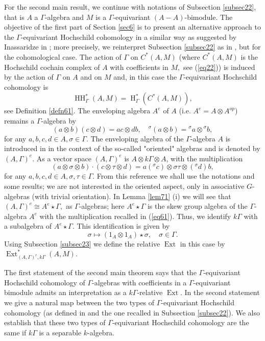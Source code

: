 \documentclass[pdflatex,sn-mathphys-num]{sn-jnl}
\numberwithin{equation}{section}
\theoremstyle{thmstyleone}
\theoremstyle{thmstyletwo}
\theoremstyle{thmstylethree}
\newcommand{\Ext}{\operatorname{Ext}}
\newcommand{\Hrm}{\operatorname{H}}
\newcommand{\HH}{\operatorname{HH}}
\begin{document}
For the second main result, we continue  with notations of Subsection \ref{subsec22}, that is $A$ a $\Gamma$-algebra and $M$ is a $\Gamma$-equivariant $(A-A)$-bimodule. The objective of the first part of Section \ref{sec6} is to present an alternative approach to the $\Gamma$-equivariant Hochschild cohomology in a similar way as suggested by Inassaridze in \cite[Section 5]{In}; more precisely, we reinterpret Subsection \ref{subsec22} as in \cite[Definition 5.1]{In}, but for the cohomological case. The action of $\Gamma$ on $C^*(A,M)$ (where $C^*(A,M)$ is the Hochschild cochain complex of $A$ with coefficients in $M,$ see (\ref{eq22})) is induced by the action of $\Gamma$ on $A$ and on $M$ and, in this case the $\Gamma$-equivariant Hochschild cohomology is
$$\HH_{\Gamma}^*(A,M)=\Hrm_{\Gamma}^*(C^*(A,M)),$$
see Definition \ref{defn61}. The enveloping algebra $A^e$ of $A$ (i.e. $A^e=A\otimes A^{op}$) remains a $\Gamma$-algebra by
$$(a\otimes b)(c\otimes d)=ac \otimes db,\quad {}^{\sigma}(a\otimes b)={}^{\sigma}a\otimes {}^{\sigma}b,$$
 for any $ a,b,c,d\in A, \sigma \in \Gamma.$  The enveloping algebra of the $\Gamma$-algebra $A$  is introduced in \citep{KoPi} in the context of the so-called "oriented" algebras and is denoted by $(A,\Gamma)^e.$ As a vector space $(A,\Gamma)^e$ is $A\otimes k\Gamma\otimes A$, with the multiplication
$$(a\otimes \sigma \otimes b)\cdot (c\otimes \tau \otimes d)=a({}^{\sigma}c)\otimes \sigma \tau \otimes ({}^{\sigma}d) b,$$
 for any $a,b,c,d\in A, \sigma,\tau \in \Gamma.$ From this reference \citep{KoPi} we shall use the notations and some results; we are not interested in the oriented aspect, only in associative $G$-algebras (with trivial orientation). In Lemma \ref{lem71} (i) we will see that $(A,\Gamma)^e\cong A^e \star \Gamma,$ as $\Gamma$-algebras; here $A^e \star \Gamma$ is the skew group algebra of the $\Gamma$-algebra $A^e$ with the multiplication recalled in (\ref{eq61}). Thus,  we identify  $k\Gamma$ with a subalgebra of $A^e\star \Gamma.$ This identification is given by
$$\sigma \mapsto (1_A\otimes 1_A)\star\sigma,\quad \sigma\in \Gamma.$$
Using Subsection \ref{subsec23} we define the relative $\Ext$ in this case by $\Ext_{(A,\Gamma)^e,k\Gamma}^*(A,M).$

The first statement of the second main theorem says that the $\Gamma$-equivariant Hochschild cohomology of $\Gamma$-algebras with coefficients in a $\Gamma$-equivariant bimodule admits an interpretation as a $k\Gamma$-relative $\Ext.$ In the second statement we give a natural map between the two types of $\Gamma$-equivariant Hochschild cohomology (as defined in \cite{KoPi} and the one recalled in Subsection \ref{subsec22}). We also establish that these two types of $\Gamma$-equivariant Hochschild cohomology are the same if $k\Gamma$ is a separable $k$-algebra.
\end{document}
